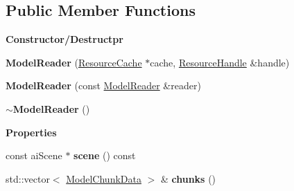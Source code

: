 \subsection*{Public Member Functions}
\begin{Indent}\textbf{ Constructor/\+Destructpr}\par
\begin{DoxyCompactItemize}
\item 
\mbox{\label{classrev_1_1_model_reader_af3e5308ddb39ed44b5f1d22f52748ccb}} 
{\bfseries Model\+Reader} (\mbox{\hyperlink{classrev_1_1_resource_cache}{Resource\+Cache}} $\ast$cache, \mbox{\hyperlink{classrev_1_1_resource_handle}{Resource\+Handle}} \&handle)
\item 
\mbox{\label{classrev_1_1_model_reader_a421b0ae29dd197ae8c048b0a6161b99f}} 
{\bfseries Model\+Reader} (const \mbox{\hyperlink{classrev_1_1_model_reader}{Model\+Reader}} \&reader)
\item 
\mbox{\label{classrev_1_1_model_reader_a643278cd1489019007654a1745c8c3d0}} 
{\bfseries $\sim$\+Model\+Reader} ()
\end{DoxyCompactItemize}
\end{Indent}
\begin{Indent}\textbf{ Properties}\par
\begin{DoxyCompactItemize}
\item 
\mbox{\label{classrev_1_1_model_reader_acabf872cd8ed7cbc5ac62a1fce61eb55}} 
const ai\+Scene $\ast$ {\bfseries scene} () const
\item 
\mbox{\label{classrev_1_1_model_reader_a34ab5d24501659876b4de52652e85a37}} 
std\+::vector$<$ \mbox{\hyperlink{structrev_1_1_model_chunk_data}{Model\+Chunk\+Data}} $>$ \& {\bfseries chunks} ()
\end{DoxyCompactItemize}
\end{Indent}
